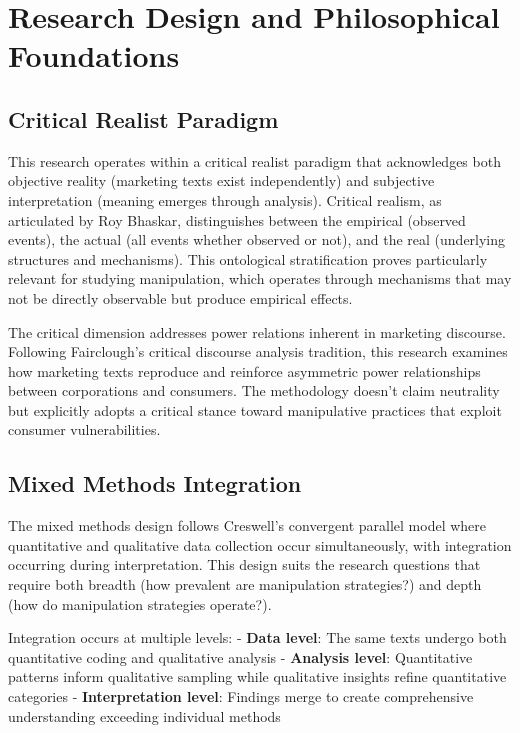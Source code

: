 \section{Research Design and Philosophical Foundations}
\label{sec:design}

\subsection{Critical Realist Paradigm}

This research operates within a critical realist paradigm that acknowledges both objective reality (marketing texts exist independently) and subjective interpretation (meaning emerges through analysis). Critical realism, as articulated by Roy Bhaskar, distinguishes between the empirical (observed events), the actual (all events whether observed or not), and the real (underlying structures and mechanisms). This ontological stratification proves particularly relevant for studying manipulation, which operates through mechanisms that may not be directly observable but produce empirical effects.

The critical dimension addresses power relations inherent in marketing discourse. Following Fairclough's critical discourse analysis tradition, this research examines how marketing texts reproduce and reinforce asymmetric power relationships between corporations and consumers. The methodology doesn't claim neutrality but explicitly adopts a critical stance toward manipulative practices that exploit consumer vulnerabilities.

\subsection{Mixed Methods Integration}

The mixed methods design follows Creswell's convergent parallel model where quantitative and qualitative data collection occur simultaneously, with integration occurring during interpretation. This design suits the research questions that require both breadth (how prevalent are manipulation strategies?) and depth (how do manipulation strategies operate?).

Integration occurs at multiple levels:
- \textbf{Data level}: The same texts undergo both quantitative coding and qualitative analysis
- \textbf{Analysis level}: Quantitative patterns inform qualitative sampling while qualitative insights refine quantitative categories
- \textbf{Interpretation level}: Findings merge to create comprehensive understanding exceeding individual methods

